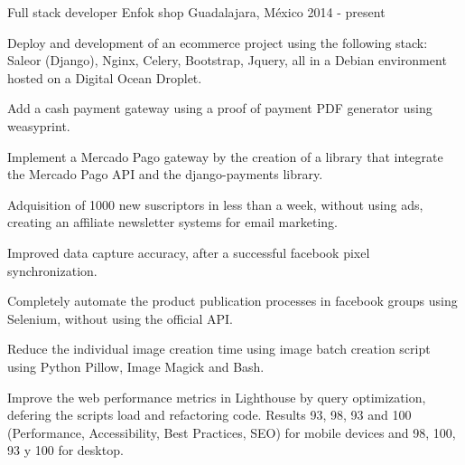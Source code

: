 

\begin{cventries}

  \cventry
    {Full stack developer}
    {Enfok shop}
    {Guadalajara, México}
    {2014 - present}
    {
      \begin{cvitems}
        \item {Deploy and development of an ecommerce project using the following stack: Saleor (Django), Nginx, Celery, Bootstrap, Jquery, all in a Debian environment hosted on a Digital Ocean Droplet.}
        \item {Add a cash payment gateway using a proof of payment PDF generator using weasyprint.}
        \item {Implement a Mercado Pago gateway by the creation of a library that integrate the Mercado Pago API and the django-payments library.}
        \item {Adquisition of 1000 new suscriptors in less than a week, without using ads, creating an affiliate newsletter systems for email marketing.}
        \item {Improved data capture accuracy, after a successful facebook pixel synchronization.}
        \item {Completely automate the product publication processes in facebook groups using Selenium, without using the official API.}
        \item {Reduce the individual image creation time using image batch creation script using Python Pillow, Image Magick and Bash.}
        \item {Improve the web performance metrics in Lighthouse by query optimization, defering the scripts load and refactoring code. Results 93, 98, 93 and 100 (Performance, Accessibility, Best Practices, SEO) for mobile devices and 98, 100, 93 y 100 for desktop.}
      \end{cvitems}
    }


\end{cventries}
